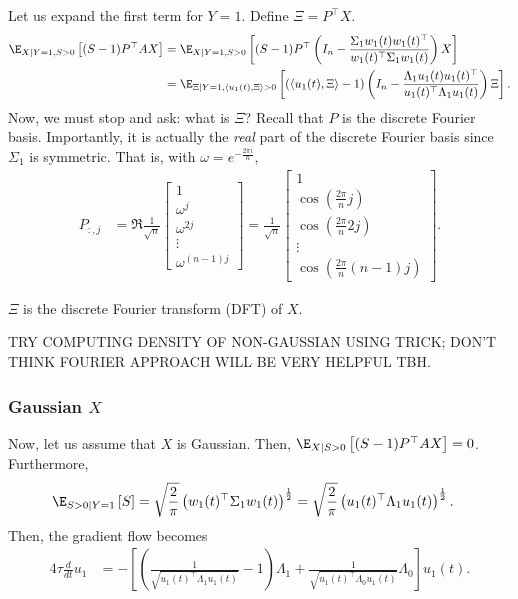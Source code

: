 \documentclass{article}
\begin{document}
Let us expand the first term for $Y=1$.
Define $\Xi = P^\top X$.
\begin{align}
  \E_{X \mid Y=1, S>0} \left[ (S-1) P^\top AX \right]
  &= \E_{X \mid Y=1, S>0} \left[ (S-1) P^\top \left( I_n - \frac{\Sigma_1 w_1(t) w_1(t)^\top}{w_1(t)^\top \Sigma_1 w_1(t)} \right) X \right] \\
  &= \E_{\Xi \mid Y=1, \langle u_1(t), \Xi \rangle > 0} \left[ (\langle u_1(t), \Xi \rangle-1) \left( I_n - \frac{\Lambda_1 u_1(t) u_1(t)^\top}{u_1(t)^\top \Lambda_1 u_1(t)} \right) \Xi \right].
\end{align}
Now, we must stop and ask: what is $\Xi$?
Recall that $P$ is the discrete Fourier basis.
Importantly, it is actually the \textit{real} part of the discrete Fourier basis since $\Sigma_1$ is symmetric.
That is, with $\omega = e^{-\frac{2 \pi i}{n}}$,
\begin{align}
  P_{:,j} 
  &= \Re \frac{1}{\sqrt{n}} \begin{bmatrix} 1 \\ \omega^j \\ \omega^{2j} \\ \vdots \\ \omega^{(n-1)j} \end{bmatrix}
  = \frac{1}{\sqrt{n}} \begin{bmatrix} 1 \\ \cos( \frac{2 \pi}{n} j ) \\ \cos( \frac{2 \pi}{n} 2j ) \\ \vdots \\ \cos( \frac{2 \pi}{n} (n-1) j ) \end{bmatrix}.
\end{align}

$\Xi$ is the discrete Fourier transform (DFT) of $X$.

TRY COMPUTING DENSITY OF NON-GAUSSIAN USING TRICK; DON'T THINK FOURIER APPROACH WILL BE VERY HELPFUL TBH.





\subsubsection{Gaussian $X$}
Now, let us assume that $X$ is Gaussian.
Then, $\E_{X \mid S>0} \left[ (S-1) P^\top AX \right] = 0$.
Furthermore,
\begin{align}
  \E_{S>0 \mid Y=1} \left[ S \right] 
  &= \sqrt{ \frac{2}{\pi} } \left( w_1(t)^\top \Sigma_1 w_1(t) \right)^{\frac{1}{2}}
  = \sqrt{ \frac{2}{\pi} } \left( u_1(t)^\top \Lambda_1 u_1(t) \right)^{\frac{1}{2}}.
\end{align}
Then, the gradient flow becomes
\begin{align}
  4 \tau \frac{d}{dt} u_1
  &= -\left[ \left( \frac{ 1 }{ \sqrt{ u_1(t)^\top \Lambda_1 u_1(t) } } - 1 \right) \Lambda_1 + \frac{ 1 }{ \sqrt{ u_1(t)^\top \Lambda_0 u_1(t) } } \Lambda_0 \right] u_1(t).
\end{align}
\end{document}
